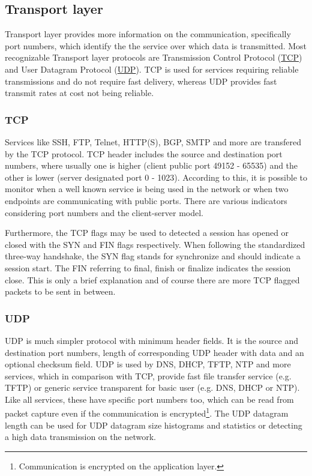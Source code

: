 \documentclass[12pt,a4paper,twoside]{report}
\begin{document}
		\subsection{Transport layer} \label{analysis:data:transport}
			Transport layer provides more information on the communication, specifically port numbers, which identify the the service over which data is transmitted. Most recognizable Transport layer protocols are Transmission Control Protocol (\hyperref[analysis:data:transport:tcp]{TCP}) and User Datagram Protocol (\hyperref[analysis:data:transport:udp]{UDP}). TCP is used for services requiring reliable transmissions and do not require fast delivery, whereas UDP provides fast transmit rates at cost not being reliable.
			\subsubsection{TCP} \label{analysis:data:transport:tcp}
				Services like SSH, FTP, Telnet, HTTP(S), BGP, SMTP and more are transfered by the TCP protocol. TCP header includes the source and destination port numbers, where usually one is higher (client public port 49152 - 65535) and the other is lower (server designated port 0 - 1023). According to this, it is possible to monitor when a well known service is being used in the network or when two endpoints are communicating with public ports. There are various indicators considering port numbers and the client-server model.\par
				Furthermore, the TCP flags may be used to detected a session has opened or closed with the SYN and FIN flags respectively. When following the standardized three-way handshake, the SYN flag stands for synchronize and should indicate a session start. The FIN referring to final, finish or finalize indicates the session close. This is only a brief explanation and of course there are more TCP flagged packets to be sent in between.
			\subsubsection{UDP} \label{analysis:data:transport:udp}
				UDP is much simpler protocol with minimum header fields. It is the source and destination port numbers, length of corresponding UDP header with data and an optional checksum field. UDP is used by DNS, DHCP, TFTP, NTP and more services, which in comparison with TCP, provide fast file transfer service (e.g. TFTP) or generic service transparent for basic user (e.g. DNS, DHCP or NTP). Like all services, these have specific port numbers too, which can be read from packet capture even if the communication is encrypted\footnote{Communication is encrypted on the application layer.}. The UDP datagram length can be used for UDP datagram size histograms and statistics or detecting a high data transmission on the network.
\end{document}
